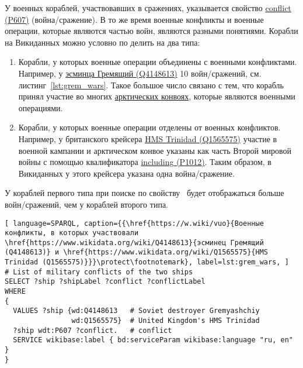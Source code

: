 У военных кораблей, участвовавших в сражениях, указывается свойство \href{https://www.wikidata.org/wiki/Property:P607}{conflict (P607)} (война/сражение). В то же время военные конфликты и военные операции, которые являются частью войн, являются разными понятиями. Корабли на Викиданных можно условно по делить на два типа:

\begin{enumerate}
  \item Корабли, у которых военные операции объединены с военными конфликтами. Например, у \href{https://www.wikidata.org/wiki/Q4148613}{эсминца Гремящий (Q4148613)} 10 войн/сражений, см. листинг~\ref{lst:grem_wars}. Такое большое число связано с тем, что корабль принял участие во многих \href{https://ru.wikipedia.org/wiki/Арктические_конвои}{арктических конвоях}, которые являются военными операциями.
  \item Корабли, у которых военные операции отделены от военных конфликтов. Например, у британского крейсера \href{https://www.wikidata.org/wiki/Q1565575}{HMS Trinidad (Q1565575)} участие в военной кампании и арктическом конвое указаны как часть Второй мировой войны с помощью квалификатора \href{https://www.wikidata.org/wiki/Property:P1012}{including (P1012)}. Таким образом, в Викиданных у этого крейсера указана одна война/сражение.
\end{enumerate}

У кораблей первого типа при поиске по свойству~ будет отображаться больше войн/сражений, чем у кораблей второго типа. 

\label{question:ship_3}


\begin{lstlisting}[ language=SPARQL, caption={{\href{https://w.wiki/vuo}{Военные конфликты, в которых участвовали \href{https://www.wikidata.org/wiki/Q4148613}{эсминец Гремящий (Q4148613)} и \href{https://www.wikidata.org/wiki/Q1565575}{HMS Trinidad (Q1565575)}}}\protect\footnotemark}, label=lst:grem_wars, ]
# List of military conflicts of the two ships 
SELECT ?ship ?shipLabel ?conflict ?conflictLabel
WHERE
{
  VALUES ?ship {wd:Q4148613   # Soviet destroyer Gremyashchiy
                wd:Q1565575}  # United Kingdom's HMS Trinidad
  ?ship wdt:P607 ?conflict.   # conflict
  SERVICE wikibase:label { bd:serviceParam wikibase:language "ru, en" }
}
\end{lstlisting}

